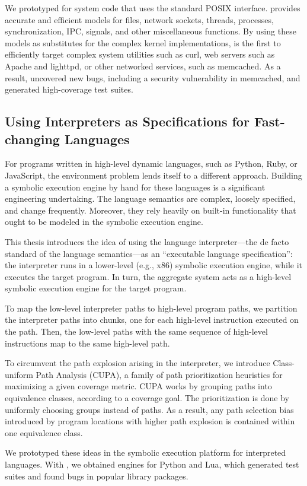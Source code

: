 We prototyped \cnine for system code that uses the standard POSIX interface.  \cnine provides accurate and efficient models for files, network sockets, threads, processes, synchronization, IPC, signals, and other miscellaneous functions.
%
By using these models as substitutes for the complex kernel implementations, \cnine is the first to efficiently target complex system utilities such as \textsf{curl}, web servers such as Apache and lighttpd, or other networked services, such as memcached.
%
As a result, \cnine uncovered new bugs, including a security vulnerability in memcached, and generated high-coverage test suites.


\subsection{Using Interpreters as Specifications for Fast-changing Languages}

For programs written in high-level dynamic languages, such as Python, Ruby, or JavaScript, the environment problem lends itself to a different approach.
%
Building a symbolic execution engine by hand for these languages is a significant engineering undertaking.  The language semantics are complex, loosely specified, and change frequently.  Moreover, they rely heavily on built-in functionality that ought to be modeled in the symbolic execution engine.

This thesis introduces the idea of using the language interpreter---the de facto standard of the language semantics---as an ``executable language specification'': the interpreter runs in a lower-level (e.g., x86) symbolic execution engine, while it executes the target program.  In turn, the aggregate system acts as a high-level symbolic execution engine for the target program.

To map the low-level interpreter paths to high-level program paths, we partition the interpreter paths into chunks, one for each high-level instruction executed on the path. Then, the low-level paths with the same sequence of high-level instructions map to the same high-level path.

To circumvent the path explosion arising in the interpreter, we introduce Class-uniform Path Analysis (CUPA), a family of path prioritization heuristics for maximizing a given coverage metric.
%
CUPA works by grouping paths into equivalence classes, according to a coverage goal.  The prioritization is done by uniformly choosing groups instead of paths.  As a result, any path selection bias introduced by program locations with higher path explosion is contained within one equivalence class.

We prototyped these ideas in the \chef symbolic execution platform for interpreted languages.  With \chef, we obtained engines for Python and Lua, which generated test suites and found bugs in popular library packages.


